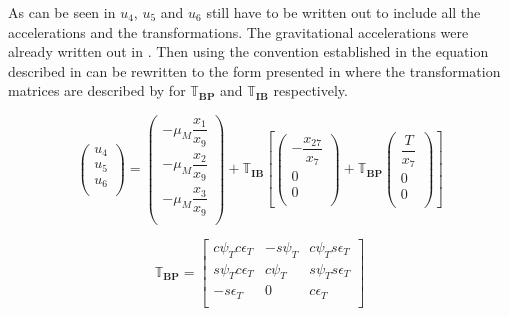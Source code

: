 As can be seen in  $u_{4}$, $u_{5}$ and $u_{6}$ still have to be written out to include all the accelerations and the transformations. The gravitational accelerations were already written out in . Then using the convention established in  the equation described in  can be rewritten to the form presented in  where the transformation matrices are described by  for $\mathbb{T}_{\mathbf{BP}}$ and $\mathbb{T}_{\mathbf{IB}}$ respectively.

\begin{equation} \label{eq:accAux}
\begin{pmatrix}
u_{4}\\
u_{5}\\
u_{6}\\
\end{pmatrix}
=
\begin{pmatrix}
-\mu_{M}\dfrac{x_{1}}{x_{9}}\\
-\mu_{M}\dfrac{x_{2}}{x_{9}}\\
-\mu_{M}\dfrac{x_{3}}{x_{9}}\\
\end{pmatrix}+
\mathbb{T}_{\mathbf{IB}}\left[
\begin{pmatrix}
-\dfrac{x_{27}}{x_{7}}\\
0\\
0\\
\end{pmatrix}
+ 
\mathbb{T}_{\mathbf{BP}}
\begin{pmatrix}
\dfrac{T}{x_{7}}\\
0\\
0\\
\end{pmatrix}
\right]
\end{equation}


\begin{equation} \label{eq:BPtrans}
\mathbb{T}_{\mathbf{BP}}=
\begin{bmatrix}
c\psi_{T}c\epsilon_{T} & -s\psi_{T} & c\psi_{T}s\epsilon_{T}\\
s\psi_{T}c\epsilon_{T} & c\psi_{T} & s\psi_{T}s\epsilon_{T}\\
-s\epsilon_{T} & 0 & c\epsilon_{T}\\
\end{bmatrix}
\end{equation}

